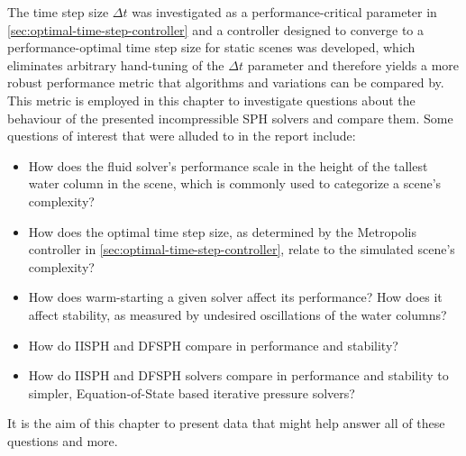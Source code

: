 \documentclass[oneside, a4paper]{book}
\begin{document}
  The time step size $\Delta t$ was investigated as a performance-critical parameter in \autoref{sec:optimal-time-step-controller} and a controller designed to converge to a performance-optimal time step size for static scenes was developed, which eliminates arbitrary hand-tuning of the $\Delta t$ parameter and therefore yields a more robust performance metric that algorithms and variations can be compared by. This metric is employed in this chapter to investigate questions about the behaviour of the presented incompressible SPH solvers and compare them. Some questions of interest that were alluded to in the report include:
  \begin{itemize}
    \item How does the fluid solver's performance scale in the height of the tallest water column in the scene, which is commonly used to categorize a scene's complexity?
    \item How does the optimal time step size, as determined by the Metropolis controller in \autoref{sec:optimal-time-step-controller}, relate to the simulated scene's complexity?
    \item How does warm-starting a given solver affect its performance? How does it affect stability, as measured by undesired oscillations of the water columns?
    \item How do IISPH and DFSPH compare in performance and stability?
    \item How do IISPH and DFSPH solvers compare in performance and stability to simpler, Equation-of-State based iterative pressure solvers?
  \end{itemize}
  
  It is the aim of this chapter to present data that might help answer all of these questions and more.
\end{document}
